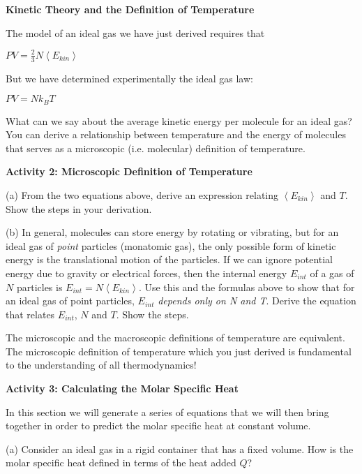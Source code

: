 \textbf{Kinetic Theory and the Definition of Temperature}

The model of an ideal gas we have just derived requires that

{\centering \( PV=\frac{2}{3}N\left\langle E_{kin}\right\rangle  \)\par}

But we have determined experimentally the ideal gas law:

{\centering \( PV = Nk_{B}T \)\par}

What can we say about the average kinetic energy per molecule for
an ideal gas? You can derive a relationship between temperature and
the energy of molecules that serves as a microscopic (i.e. molecular)
definition of temperature.

\pagebreak[2]
\textbf{Activity 2: Microscopic Definition of Temperature}

(a) From the two equations above, derive an expression relating \( \left\langle E_{kin}\right\rangle  \)
and \( T \). Show the steps in your derivation.
\vspace{1.5in}

(b) In general, molecules can store energy by rotating or vibrating,
but for an ideal gas of \emph{point} particles (monatomic gas), the only possible form of kinetic energy is the translational motion of the particles. If we can ignore potential energy due to gravity or electrical forces, then the internal
energy \( E_{int} \) of a gas of \( N \) particles is \( E_{int}=N\left\langle E_{kin}\right\rangle  \).
Use this and the formulas above to show that for an ideal gas of point particles, $E _{int}$
\emph{depends only on N and T}. Derive the equation that relates \( E_{int} \),
\( N \) and \( T \). Show the steps.
\vspace{1.5in}

The microscopic and the macroscopic definitions of temperature are
equivalent. The microscopic definition of temperature which you just
derived is fundamental to the understanding of all thermodynamics!

\pagebreak[2]
\textbf{Activity 3: Calculating the Molar Specific Heat}

In this section we will generate a series of equations that we will
then bring together in order to predict the molar specific heat at
constant volume.

(a) Consider an ideal gas in a rigid container that has a fixed volume.
How is the molar specific heat defined in terms of the heat added \( Q \)?
\answerspace{1in}

